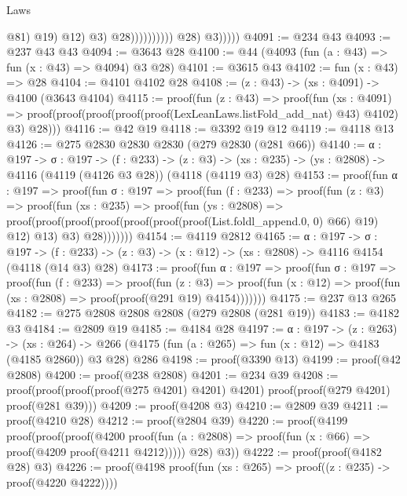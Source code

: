 \begin{lexlean}{Laws}
\begin{coremodule}
                                                    @81)
                                                  @19)
                                                @12)
                                              @3)
                                            @28))))))))))
                @28)
              @3)))))
@4091 := @234 @43
@4093 := @237 @43 @43
@4094 := @3643 @28
@4100 := @44 (@4093 (fun (a : @43) => fun (x : @43) => @4094) @3 @28)
@4101 := @3615 @43
@4102 := fun (x : @43) => @28
@4104 := @4101 @4102 @28
@4108 := (z : @43) -> (xs : @4091) -> @4100 (@3643 @4104)
@4115 := proof(fun (z : @43) =>
    proof(fun (xs : @4091) =>
      proof(proof(proof(proof(proof(LexLeanLaws.listFold_add_nat) @43) @4102) @3) @28)))
@4116 := @42 @19
@4118 := @3392 @19 @12
@4119 := @4118 @13
@4126 := @275 @2830 @2830 @2830 (@279 @2830 (@281 @66))
@4140 := {α : @197} ->
  {σ : @197} ->
  (f : @233) ->
  (z : @3) -> (xs : @235) -> (ys : @2808) -> @4116 (@4119 (@4126 @3 @28)) (@4118 (@4119 @3) @28)
@4153 := proof(fun {α : @197} =>
    proof(fun {σ : @197} =>
      proof(fun (f : @233) =>
        proof(fun (z : @3) =>
          proof(fun (xs : @235) =>
            proof(fun (ys : @2808) =>
              proof(proof(proof(proof(proof(proof(proof(List.foldl_append.{0, 0}) @66) @19) @12)
                      @13)
                    @3)
                  @28)))))))
@4154 := @4119 @2812
@4165 := {α : @197} ->
  {σ : @197} ->
  (f : @233) -> (z : @3) -> (x : @12) -> (xs : @2808) -> @4116 @4154 (@4118 (@14 @3) @28)
@4173 := proof(fun {α : @197} =>
    proof(fun {σ : @197} =>
      proof(fun (f : @233) =>
        proof(fun (z : @3) =>
          proof(fun (x : @12) => proof(fun (xs : @2808) => proof(proof(@291 @19) @4154)))))))
@4175 := @237 @13 @265
@4182 := @275 @2808 @2808 @2808 (@279 @2808 (@281 @19))
@4183 := @4182 @3
@4184 := @2809 @19
@4185 := @4184 @28
@4197 := {α : @197} ->
  (z : @263) ->
  (xs : @264) -> @266 (@4175 (fun (a : @265) => fun (x : @12) => @4183 (@4185 @2860)) @3 @28) @286
@4198 := proof(@3390 @13)
@4199 := proof(@42 @2808)
@4200 := proof(@238 @2808)
@4201 := @234 @39
@4208 := proof(proof(proof(proof(@275 @4201) @4201) @4201) proof(proof(@279 @4201) proof(@281 @39)))
@4209 := proof(@4208 @3)
@4210 := @2809 @39
@4211 := proof(@4210 @28)
@4212 := proof(@2804 @39)
@4220 := proof(@4199
      proof(proof(proof(@4200
              proof(fun (a : @2808) => proof(fun (x : @66) => proof(@4209 proof(@4211 @4212)))))
            @28)
          @3))
@4222 := proof(proof(@4182 @28) @3)
@4226 := proof(@4198 proof(fun (xs : @265) => proof((z : @235) -> proof(@4220 @4222))))

\end{coremodule}
\end{lexlean}
